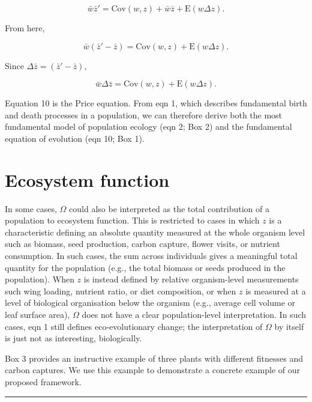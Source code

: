 \documentclass[
]{article}
\begin{document}
\[\bar{w}\bar{z}' = \mathrm{Cov}\left(w ,z \right) + \bar{w}\bar{z} + \mathrm{E}\left( w \Delta z  \right).\]

From here,

\[\bar{w}\left(\bar{z}' - \bar{z}\right) = \mathrm{Cov}\left(w ,z \right) + \mathrm{E}\left( w \Delta z  \right).\]

Since \(\Delta \bar{z} = \left(\bar{z}' - \bar{z}\right)\),

\[\bar{w}\Delta \bar{z} = \mathrm{Cov}\left(w ,z \right) + \mathrm{E}\left( w \Delta z  \right).
\tag{10}
\]

Equation 10 is the Price equation. From eqn 1, which describes
fundamental birth and death processes in a population, we can therefore
derive both the most fundamental model of population ecology (eqn 2; Box
2) and the fundamental equation of evolution (eqn 10; Box 1).

\section{Ecosystem function}\label{ecosystem-function}

In some cases, \(\Omega\) could also be interpreted as the total
contribution of a population to ecosystem function. This is restricted
to cases in which \(z\) is a characteristic defining an absolute
quantity measured at the whole organism level such as biomass, seed
production, carbon capture, flower visits, or nutrient consumption. In
such cases, the sum across individuals gives a meaningful total quantity
for the population (e.g., the total biomass or seeds produced in the
population). When \(z\) is instead defined by relative organism-level
measurements such wing loading, nutrient ratio, or diet composition, or
when \(z\) is measured at a level of biological organisation below the
organism (e.g., average cell volume or leaf surface area), \(\Omega\)
does not have a clear population-level interpretation. In such cases,
eqn 1 still defines eco-evolutionary change; the interpretation of
\(\Omega\) by itself is just not as interesting, biologically.

Box 3 provides an instructive example of three plants with different
fitnesses and carbon captures. We use this example to demonstrate a
concrete example of our proposed framework.

\begin{center}\rule{0.5\linewidth}{0.5pt}\end{center}
\end{document}
